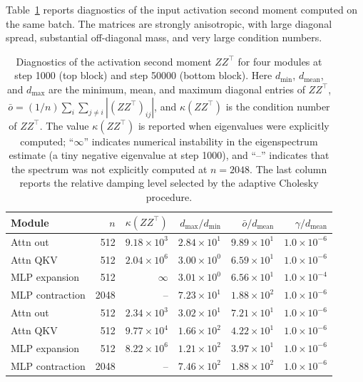 \documentclass[11pt]{article}
\begin{document}
Table~\ref{tab:real-K-stats} reports diagnostics of the input activation second moment computed on the same batch. The matrices are strongly anisotropic, with large diagonal spread, substantial off-diagonal mass, and very large condition numbers.


\begin{table}[htb]
  \centering
  \small
  \setlength{\tabcolsep}{4pt}
  \renewcommand{\arraystretch}{1.12}
  \begin{tabular}{l r r r r r}
    \hline
    Module & $n$ &
    $\kappa({Z}{Z}^\top)$ &
    $d_{\max}/d_{\min}$ &
    $\bar{o}/d_{\mathrm{mean}}$ &
    $\gamma/d_{\mathrm{mean}}$ \\
    \hline
    Attn out   &  512 & $9.18\times 10^{3}$ & $2.84\times 10^{1}$ & $9.89\times 10^{1}$ & $1.0\times 10^{-6}$ \\
    Attn QKV   &  512 & $2.04\times 10^{6}$ & $3.00\times 10^{0}$ & $6.59\times 10^{1}$ & $1.0\times 10^{-6}$ \\
    MLP expansion &  512 & $\infty$            & $3.01\times 10^{0}$ & $6.56\times 10^{1}$ & $1.0\times 10^{-4}$ \\
    MLP contraction  & 2048 & --                  & $7.23\times 10^{1}$ & $1.88\times 10^{2}$ & $1.0\times 10^{-6}$ \\
    \hline
    Attn out   &  512 & $2.34\times 10^{3}$ & $3.02\times 10^{1}$ & $7.21\times 10^{1}$ & $1.0\times 10^{-6}$ \\
    Attn QKV   &  512 & $9.77\times 10^{4}$ & $1.66\times 10^{2}$ & $4.22\times 10^{1}$ & $1.0\times 10^{-6}$ \\
    MLP expansion &  512 & $8.22\times 10^{6}$ & $1.21\times 10^{2}$ & $3.97\times 10^{1}$ & $1.0\times 10^{-6}$ \\
    MLP contraction  & 2048 & --                  & $7.46\times 10^{2}$ & $1.88\times 10^{2}$ & $1.0\times 10^{-6}$ \\
    \hline
  \end{tabular}
  \caption{Diagnostics of the activation second moment ${Z}{Z}^\top$ for four modules at step 1000 (top block) and step 50000 (bottom block). Here $d_{\min}$, $d_{\mathrm{mean}}$, and $d_{\max}$ are the minimum, mean, and maximum diagonal entries of ${Z}{Z}^\top$, $\bar{o}=(1/n)\sum_i\sum_{j\neq i}|({Z}{Z}^\top)_{ij}|$, and $\kappa({Z}{Z}^\top)$ is the condition number of ${Z}{Z}^\top$. The value $\kappa({Z}{Z}^\top)$ is reported when eigenvalues were explicitly computed; ``$\infty$'' indicates numerical instability in the eigenspectrum estimate (a tiny negative eigenvalue at step 1000), and ``--'' indicates that the spectrum was not explicitly computed at $n=2048$. The last column reports the relative damping level selected by the adaptive Cholesky procedure.}
  \label{tab:real-K-stats}
\end{table}
\end{document}
